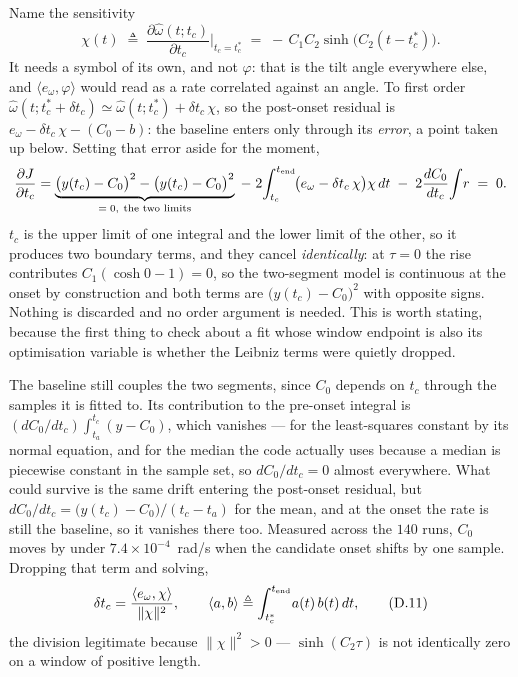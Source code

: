 \documentclass[11pt]{article}
\begin{document}
Name the sensitivity
\[
  \chi(t) \;\triangleq\;
  \frac{\partial\hat\omega(t;t_c)}{\partial t_c}\bigg|_{t_c = t_c^*}
  \;=\; -\,C_1C_2\sinh\bigl(C_2(t-t_c^*)\bigr) .
\]
It needs a symbol of its own, and not $\varphi$: that is the tilt angle
everywhere else, and $\langle e_\omega,\varphi\rangle$ would read as a
rate correlated against an angle. To first order
$\hat\omega(t;t_c^*+\delta t_c)\simeq\hat\omega(t;t_c^*) + \delta t_c\,\chi$,
so the post-onset residual is $e_\omega - \delta t_c\,\chi - (C_0-b)$:
the baseline enters only through its \emph{error}, a point taken up
below. Setting that error aside for the moment,
\[
  \frac{\partial J}{\partial t_c}
  = \underbrace{\bigl(y(t_c) - C_0\bigr)^2
              - \bigl(y(t_c) - C_0\bigr)^2}_{=\;0,\ \text{the two limits}}
    \;-\;2\!\int_{t_c}^{t_{\rm end}}\!\bigl(e_\omega - \delta t_c\,\chi\bigr)
    \chi\,dt
    \;-\;2\frac{dC_0}{dt_c}\!\int\! r \;=\; 0 .
\]
$t_c$ is the upper limit of one integral and the lower limit of the
other, so it produces two boundary terms, and they cancel
\emph{identically}: at $\tau = 0$ the rise contributes
$C_1(\cosh 0 - 1) = 0$, so the two-segment model is continuous at the
onset by construction and both terms are $\bigl(y(t_c)-C_0\bigr)^2$
with opposite signs. Nothing is discarded and no order argument is
needed. This is worth stating, because the first thing to check about a
fit whose window endpoint is also its optimisation variable is whether
the Leibniz terms were quietly dropped.

The baseline still couples the two segments, since $C_0$ depends on
$t_c$ through the samples it is fitted to. Its contribution to the
pre-onset integral is $(dC_0/dt_c)\int_{t_a}^{t_c}(y - C_0)$, which
vanishes --- for the least-squares constant by its normal equation, and
for the median the code actually uses because a median is piecewise
constant in the sample set, so $dC_0/dt_c = 0$ almost everywhere. What
could survive is the same drift entering the post-onset residual, but
$dC_0/dt_c = \bigl(y(t_c) - C_0\bigr)/(t_c - t_a)$ for the mean, and at
the onset the rate is still the baseline, so it vanishes there too.
Measured across the $140$ runs, $C_0$ moves by under
$7.4\times10^{-4}$~rad/s when the candidate onset shifts by one sample.
Dropping that term and solving,
\begin{equation}
  \delta t_c = \frac{\langle e_\omega,\chi\rangle}{\|\chi\|^2},
  \qquad
  \langle a,b\rangle \triangleq \int_{t_c^*}^{t_{\rm end}}\!a(t)\,b(t)\,dt ,
  \tag{D.11}
\end{equation}
the division legitimate because $\|\chi\|^2>0$ --- $\sinh(C_2\tau)$ is
not identically zero on a window of positive length.
\end{document}
